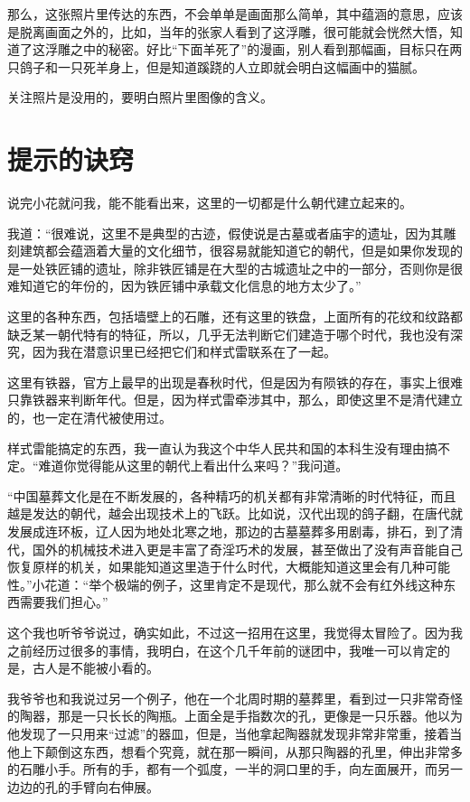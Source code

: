 那么，这张照片里传达的东西，不会单单是画面那么简单，其中蕴涵的意思，应该是脱离画面之外的，比如，当年的张家人看到了这浮雕，很可能就会恍然大悟，知道了这浮雕之中的秘密。好比“下面羊死了”的漫画，别人看到那幅画，目标只在两只鸽子和一只死羊身上，但是知道蹊跷的人立即就会明白这幅画中的猫腻。

关注照片是没用的，要明白照片里图像的含义。

\chapter{提示的诀窍}

说完小花就问我，能不能看出来，这里的一切都是什么朝代建立起来的。

我道：“很难说，这里不是典型的古迹，假使说是古墓或者庙宇的遗址，因为其雕刻建筑都会蕴涵着大量的文化细节，很容易就能知道它的朝代，但是如果你发现的是一处铁匠铺的遗址，除非铁匠铺是在大型的古城遗址之中的一部分，否则你是很难知道它的年份的，因为铁匠铺中承载文化信息的地方太少了。”

这里的各种东西，包括墙壁上的石雕，还有这里的铁盘，上面所有的花纹和纹路都缺乏某一朝代特有的特征，所以，几乎无法判断它们建造于哪个时代，我也没有深究，因为我在潜意识里已经把它们和样式雷联系在了一起。

这里有铁器，官方上最早的出现是春秋时代，但是因为有陨铁的存在，事实上很难只靠铁器来判断年代。但是，因为样式雷牵涉其中，那么，即使这里不是清代建立的，也一定在清代被使用过。

样式雷能搞定的东西，我一直认为我这个中华人民共和国的本科生没有理由搞不定。“难道你觉得能从这里的朝代上看出什么来吗？”我问道。

“中国墓葬文化是在不断发展的，各种精巧的机关都有非常清晰的时代特征，而且越是发达的朝代，越会出现技术上的飞跃。比如说，汉代出现的鸽子翻，在唐代就发展成连环板，辽人因为地处北寒之地，那边的古墓墓葬多用剧毒，排石，到了清代，国外的机械技术进入更是丰富了奇淫巧术的发展，甚至做出了没有声音能自己恢复原样的机关，如果能知道这里造于什么时代，大概能知道这里会有几种可能性。”小花道：“举个极端的例子，这里肯定不是现代，那么就不会有红外线这种东西需要我们担心。”

这个我也听爷爷说过，确实如此，不过这一招用在这里，我觉得太冒险了。因为我之前经历过很多的事情，我明白，在这个几千年前的谜团中，我唯一可以肯定的是，古人是不能被小看的。

我爷爷也和我说过另一个例子，他在一个北周时期的墓葬里，看到过一只非常奇怪的陶器，那是一只长长的陶瓶。上面全是手指数次的孔，更像是一只乐器。他以为他发现了一只用来“过滤”的器皿，但是，当他拿起陶器就发现非常非常重，接着当他上下颠倒这东西，想看个究竟，就在那一瞬间，从那只陶器的孔里，伸出非常多的石雕小手。所有的手，都有一个弧度，一半的洞口里的手，向左面展开，而另一边边的孔的手臂向右伸展。

